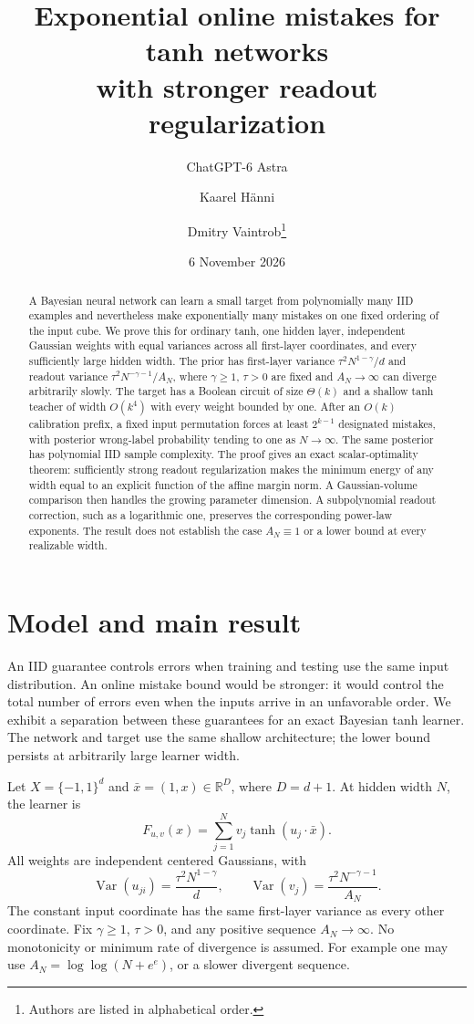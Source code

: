 \documentclass[11pt]{article}
\title{Exponential online mistakes for tanh networks\protect\\with stronger readout regularization}
\author{ChatGPT-6 Astra \and Kaarel H\"anni \and Dmitry Vaintrob\thanks{Authors are listed in alphabetical order.}}
\date{6 November 2026}
\newcommand{\R}{\mathbb R}
\begin{document}
\maketitle

\begin{abstract}
A Bayesian neural network can learn a small target from polynomially
many IID examples and nevertheless make exponentially many mistakes on
one fixed ordering of the input cube. We prove this for ordinary tanh,
one hidden layer, independent Gaussian weights with equal variances
across all first-layer coordinates, and every sufficiently large hidden
width. The prior has first-layer variance $\tau^2N^{1-\gamma}/d$ and
readout variance $\tau^2N^{-\gamma-1}/A_N$, where $\gamma\ge1$, $\tau>0$
are fixed and $A_N\to\infty$ can diverge arbitrarily slowly.
The target has a Boolean circuit of size $\Theta(k)$ and a shallow tanh
teacher of width $O(k^4)$ with every weight bounded by one. After an
$O(k)$ calibration prefix, a fixed input permutation forces at least
$2^{k-1}$ designated mistakes, with posterior wrong-label probability
tending to one as $N\to\infty$. The same posterior has polynomial IID
sample complexity. The proof gives an exact scalar-optimality theorem:
sufficiently strong readout regularization makes the minimum energy of
any width equal to an explicit function of the affine margin norm.
A Gaussian-volume comparison then handles the growing parameter dimension.
A subpolynomial readout correction, such as a logarithmic one, preserves
the corresponding power-law exponents. The result does not establish the
case $A_N\equiv1$ or a lower bound at every realizable width.
\end{abstract}

\section{Model and main result}

An IID guarantee controls errors when training and testing use the same
input distribution. An online mistake bound would be stronger: it would
control the total number of errors even when the inputs arrive in an
unfavorable order. We exhibit a separation between these guarantees for
an exact Bayesian tanh learner. The network and target use the same
shallow architecture; the lower bound persists at arbitrarily large
learner width.

Let $X=\{-1,1\}^d$ and $\bar x=(1,x)\in\R^{D}$, where $D=d+1$.
At hidden width $N$, the learner is
\begin{equation}\label{eq:model}
 F_{u,v}(x)=\sum_{j=1}^N v_j\tanh(u_j\cdot\bar x).
\end{equation}
All weights are independent centered Gaussians, with
\begin{equation}\label{eq:prior}
 \operatorname{Var}(u_{ji})=\frac{\tau^2N^{1-\gamma}}d,
 \qquad
 \operatorname{Var}(v_j)=\frac{\tau^2N^{-\gamma-1}}{A_N}.
\end{equation}
The constant input coordinate has the same first-layer variance as every
other coordinate. Fix $\gamma\ge1$, $\tau>0$, and any positive sequence
$A_N\to\infty$. No monotonicity or minimum rate of divergence is assumed.
For example one may use
$A_N=\log\log(N+e^e)$, or a slower divergent sequence.
\end{document}
